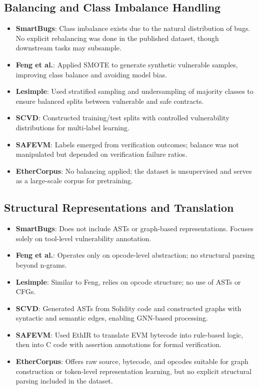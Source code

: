 \subsection*{Balancing and Class Imbalance Handling}

\begin{itemize}
    \item \textbf{SmartBugs}: Class imbalance exists due to the natural distribution of bugs. No explicit rebalancing was done in the published dataset, though downstream tasks may subsample.
    \item \textbf{Feng et al.}: Applied SMOTE to generate synthetic vulnerable samples, improving class balance and avoiding model bias.
    \item \textbf{Lesimple}: Used stratified sampling and undersampling of majority classes to ensure balanced splits between vulnerable and safe contracts.
    \item \textbf{SCVD}: Constructed training/test splits with controlled vulnerability distributions for multi-label learning.
    \item \textbf{SAFEVM}: Labels emerged from verification outcomes; balance was not manipulated but depended on verification failure ratios.
    \item \textbf{EtherCorpus}: No balancing applied; the dataset is unsupervised and serves as a large-scale corpus for pretraining.
\end{itemize}

\subsection*{Structural Representations and Translation}

\begin{itemize}
    \item \textbf{SmartBugs}: Does not include ASTs or graph-based representations. Focuses solely on tool-level vulnerability annotation.
    \item \textbf{Feng et al.}: Operates only on opcode-level abstraction; no structural parsing beyond n-grams.
    \item \textbf{Lesimple}: Similar to Feng, relies on opcode structure; no use of ASTs or CFGs.
    \item \textbf{SCVD}: Generated ASTs from Solidity code and constructed graphs with syntactic and semantic edges, enabling GNN-based processing.
    \item \textbf{SAFEVM}: Used EthIR to translate EVM bytecode into rule-based logic, then into C code with assertion annotations for formal verification.
    \item \textbf{EtherCorpus}: Offers raw source, bytecode, and opcodes suitable for graph construction or token-level representation learning, but no explicit structural parsing included in the dataset.
\end{itemize}

